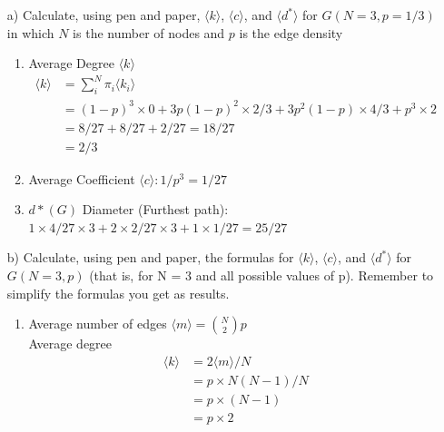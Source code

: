 \documentclass[a4paper,12pt]{article}
\begin{document}
\begin{itemize}

  
\item[a) ] Calculate, using pen and paper, $\langle k\rangle$, $\langle c \rangle$, and $\langle  d^* \rangle$ for $G(N=3, p = 1/3)$  in which $N$ is the number of nodes and $p$ is the edge density


\begin{enumerate}
\item Average Degree $\langle k  \rangle$
  \begin{equation}
    \begin{split}
      \langle k\rangle & = \sum_i^N\pi_i \langle k_i \rangle \\
      & = (1 - p)^3 \times 0 + 3p(1-p)^2 \times 2/3 + 3p^2(1-p) \times 4/3 + p^3 \times 2\\
      & = 8/27 + 8/27 + 2/27 = 18/27\\
      & = 2/3  \end{split}
  \end{equation}
\item Average Coefficient $\langle c \rangle: 1/p^3 = 1/27$

\item  $d*(G)$ Diameter  (Furthest path): \\
  $1 \times 4/27 \times 3 + 2 \times 2/27 \times 3 + 1 \times 1/27 = 25/27 $
  
  \end{enumerate}

\item[b) ] Calculate, using pen and paper, the formulas for $\langle k\rangle$, $\langle c \rangle$, and $\langle  d^* \rangle$ for $G(N=3, p)$ (that is, for N = 3 and all possible values of p). Remember to simplify the formulas you
get as results.

\begin{enumerate}
\item Average number of edges $\langle m \rangle = \binom{N}{2}p$\\
  Average degree
  \begin{equation}
    \begin{split}
      \langle k \rangle & = 2 \langle m \rangle / N\\ & = p \times N(N-1)/N \\ & = p \times (N-1) \\ & = p \times 2
    \end{split}
  \end{equation}


\end{enumerate}
\end{itemize}
\end{document}
